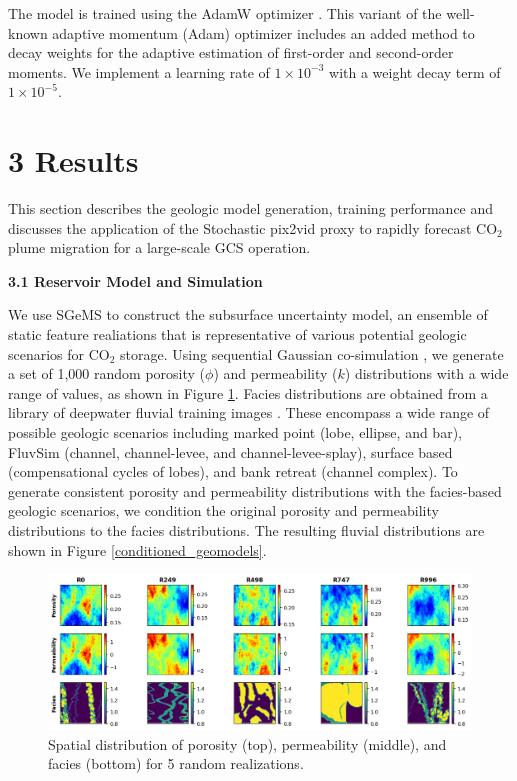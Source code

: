 \documentclass[10pt, twoside]{article}
\begin{document}
The model is trained using the AdamW optimizer \cite{loshchilov2017decoupled}. This variant of the well-known adaptive momentum (Adam) optimizer \cite{kingma2014adam} includes an added method to decay weights for the adaptive estimation of first-order and second-order moments. We implement a learning rate of $1\times10^{-3}$ with a weight decay term of $1\times10^{-5}$. 


\section*{\textbf{3 Results}}

This section describes the geologic model generation, training performance and discusses the application of the Stochastic pix2vid proxy to rapidly forecast CO$_2$ plume migration for a large-scale GCS operation.

\textbf{3.1 Reservoir Model and Simulation}

We use SGeMS \cite{Remy2009} to construct the subsurface uncertainty model, an ensemble of static feature realiations that is representative of various potential geologic scenarios for CO$_2$ storage. Using sequential Gaussian co-simulation \cite{Verly1993}, we generate a set of 1,000 random porosity ($\phi$) and permeability ($k$) distributions with a wide range of values, as shown in Figure \ref{geomodels}. Facies distributions are obtained from a library of deepwater fluvial training images \cite{PYRCZ2008542, misael_m_morales_2023_7702128}. These encompass a wide range of possible geologic scenarios including marked point (lobe, ellipse, and bar), FluvSim (channel, channel-levee, and channel-levee-splay), surface based (compensational cycles of lobes), and bank retreat (channel complex). To generate consistent porosity and permeability distributions with the facies-based geologic scenarios, we condition the original porosity and permeability distributions to the facies distributions. The resulting fluvial distributions are shown in Figure \ref{conditioned_geomodels}. 

\begin{figure}[t]
    \centering
    \includegraphics[width=\textwidth]{figures/geomodels.png}
    \caption{Spatial distribution of porosity (top), permeability (middle), and facies (bottom) for 5 random realizations.}
    \label{geomodels}
\end{figure}
\end{document}
